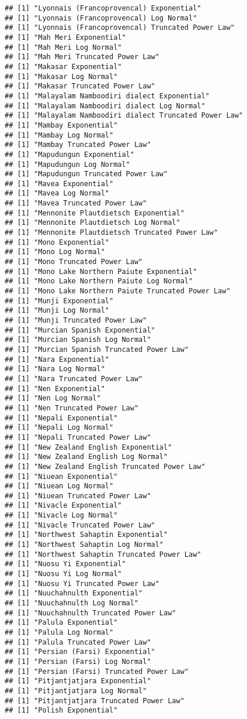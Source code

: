 \documentclass[]{article}
\begin{document}
\begin{verbatim}
## [1] "Lyonnais (Francoprovencal) Exponential"
## [1] "Lyonnais (Francoprovencal) Log Normal"
## [1] "Lyonnais (Francoprovencal) Truncated Power Law"
## [1] "Mah Meri Exponential"
## [1] "Mah Meri Log Normal"
## [1] "Mah Meri Truncated Power Law"
## [1] "Makasar Exponential"
## [1] "Makasar Log Normal"
## [1] "Makasar Truncated Power Law"
## [1] "Malayalam Namboodiri dialect Exponential"
## [1] "Malayalam Namboodiri dialect Log Normal"
## [1] "Malayalam Namboodiri dialect Truncated Power Law"
## [1] "Mambay Exponential"
## [1] "Mambay Log Normal"
## [1] "Mambay Truncated Power Law"
## [1] "Mapudungun Exponential"
## [1] "Mapudungun Log Normal"
## [1] "Mapudungun Truncated Power Law"
## [1] "Mavea Exponential"
## [1] "Mavea Log Normal"
## [1] "Mavea Truncated Power Law"
## [1] "Mennonite Plautdietsch Exponential"
## [1] "Mennonite Plautdietsch Log Normal"
## [1] "Mennonite Plautdietsch Truncated Power Law"
## [1] "Mono Exponential"
## [1] "Mono Log Normal"
## [1] "Mono Truncated Power Law"
## [1] "Mono Lake Northern Paiute Exponential"
## [1] "Mono Lake Northern Paiute Log Normal"
## [1] "Mono Lake Northern Paiute Truncated Power Law"
## [1] "Munji Exponential"
## [1] "Munji Log Normal"
## [1] "Munji Truncated Power Law"
## [1] "Murcian Spanish Exponential"
## [1] "Murcian Spanish Log Normal"
## [1] "Murcian Spanish Truncated Power Law"
## [1] "Nara Exponential"
## [1] "Nara Log Normal"
## [1] "Nara Truncated Power Law"
## [1] "Nen Exponential"
## [1] "Nen Log Normal"
## [1] "Nen Truncated Power Law"
## [1] "Nepali Exponential"
## [1] "Nepali Log Normal"
## [1] "Nepali Truncated Power Law"
## [1] "New Zealand English Exponential"
## [1] "New Zealand English Log Normal"
## [1] "New Zealand English Truncated Power Law"
## [1] "Niuean Exponential"
## [1] "Niuean Log Normal"
## [1] "Niuean Truncated Power Law"
## [1] "Nivacle Exponential"
## [1] "Nivacle Log Normal"
## [1] "Nivacle Truncated Power Law"
## [1] "Northwest Sahaptin Exponential"
## [1] "Northwest Sahaptin Log Normal"
## [1] "Northwest Sahaptin Truncated Power Law"
## [1] "Nuosu Yi Exponential"
## [1] "Nuosu Yi Log Normal"
## [1] "Nuosu Yi Truncated Power Law"
## [1] "Nuuchahnulth Exponential"
## [1] "Nuuchahnulth Log Normal"
## [1] "Nuuchahnulth Truncated Power Law"
## [1] "Palula Exponential"
## [1] "Palula Log Normal"
## [1] "Palula Truncated Power Law"
## [1] "Persian (Farsi) Exponential"
## [1] "Persian (Farsi) Log Normal"
## [1] "Persian (Farsi) Truncated Power Law"
## [1] "Pitjantjatjara Exponential"
## [1] "Pitjantjatjara Log Normal"
## [1] "Pitjantjatjara Truncated Power Law"
## [1] "Polish Exponential"

\end{verbatim}
\end{document}
